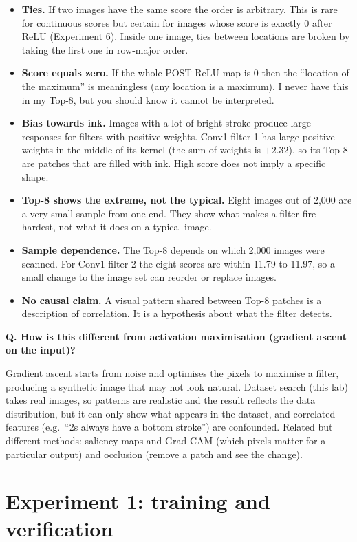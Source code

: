 \documentclass[11pt]{article}
\newcommand{\Q}[1]{\par\vspace{4pt}\noindent\textcolor{qcol}{\textbf{Q. #1}}\par\nopagebreak}
\newcommand{\A}[1]{\noindent #1\par}
\begin{document}
\begin{itemize}
\item \textbf{Ties.} If two images have the same score the order is arbitrary. This is rare for continuous scores but certain for images whose score is exactly 0 after ReLU (Experiment 6). Inside one image, ties between locations are broken by taking the first one in row-major order.
\item \textbf{Score equals zero.} If the whole POST-ReLU map is 0 then the ``location of the maximum'' is meaningless (any location is a maximum). I never have this in my Top-8, but you should know it cannot be interpreted.
\item \textbf{Bias towards ink.} Images with a lot of bright stroke produce large responses for filters with positive weights. Conv1 filter 1 has large positive weights in the middle of its kernel (the sum of weights is $+2.32$), so its Top-8 are patches that are filled with ink. High score does not imply a specific shape.
\item \textbf{Top-8 shows the extreme, not the typical.} Eight images out of 2,000 are a very small sample from one end. They show what makes a filter fire hardest, not what it does on a typical image.
\item \textbf{Sample dependence.} The Top-8 depends on which 2,000 images were scanned. For Conv1 filter 2 the eight scores are within 11.79 to 11.97, so a small change to the image set can reorder or replace images.
\item \textbf{No causal claim.} A visual pattern shared between Top-8 patches is a description of correlation. It is a hypothesis about what the filter detects.
\end{itemize}

\Q{How is this different from activation maximisation (gradient ascent on the input)?}
\A{Gradient ascent starts from noise and optimises the pixels to maximise a filter, producing a synthetic image that may not look natural. Dataset search (this lab) takes real images, so patterns are realistic and the result reflects the data distribution, but it can only show what appears in the dataset, and correlated features (e.g.\ ``2s always have a bottom stroke'') are confounded. Related but different methods: saliency maps and Grad-CAM (which pixels matter for a particular output) and occlusion (remove a patch and see the change).}

\section{Experiment 1: training and verification}
\end{document}
